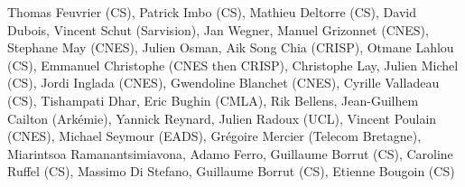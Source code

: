 Thomas Feuvrier (CS), Patrick Imbo (CS), Mathieu Deltorre (CS), David Dubois, Vincent Schut (Sarvision), Jan Wegner, Manuel Grizonnet (CNES), Stephane May (CNES), Julien Osman, Aik Song Chia (CRISP), Otmane Lahlou (CS), Emmanuel Christophe (CNES then CRISP), Christophe Lay, Julien Michel (CS), Jordi Inglada (CNES), Gwendoline Blanchet (CNES), Cyrille Valladeau (CS), Tishampati Dhar, Eric Bughin (CMLA), Rik Bellens, Jean-Guilhem Cailton (Ark\'emie), Yannick Reynard, Julien Radoux (UCL), Vincent Poulain (CNES), Michael Seymour (EADS), Gr\'egoire Mercier (Telecom Bretagne), Miarintsoa Ramanantsimiavona, Adamo Ferro, Guillaume Borrut (CS), Caroline Ruffel (CS), Massimo Di Stefano, Guillaume Borrut (CS), Etienne Bougoin (CS)